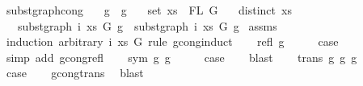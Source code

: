 \begin{isabellebody}
\isamarkupfalse%
%
\endisatagproof
{\isafoldproof}%
%
\isadelimproof
\isanewline
%
\endisadelimproof
\isanewline
\isanewline
\isanewline
{}\isamarkupfalse%
\ subst{\isacharunderscore}{\kern0pt}graph{\isacharunderscore}{\kern0pt}cong{\isacharcolon}{\kern0pt}\isanewline
\ \ \ {\isachardoublequoteopen}g{}\ {\isasymsimeq}\ g{}{\isachardoublequoteclose}\isanewline
\ \ \ {\isachardoublequoteopen}set\ xs\ {\isacharequal}{\kern0pt}\ FL\ G{\isachardoublequoteclose}\isanewline
\ \ \ {\isachardoublequoteopen}distinct\ xs{\isachardoublequoteclose}\isanewline
\ \ \ {\isachardoublequoteopen}subst{\isacharunderscore}{\kern0pt}graph\ i\ xs\ G\ g{}\ {\isasymsimeq}\ subst{\isacharunderscore}{\kern0pt}graph\ i\ xs\ G\ g{}{\isachardoublequoteclose}\isanewline
%
\isadelimproof
%
\endisadelimproof
%
\isatagproof
{}\isamarkupfalse%
\ assms\isanewline
{}\isamarkupfalse%
\ {\isacharparenleft}{\kern0pt}induction\ arbitrary{\isacharcolon}{\kern0pt}\ i\ xs\ G\ rule{\isacharcolon}{\kern0pt}\ gcong{\isachardot}{\kern0pt}induct{\isacharparenright}{\kern0pt}\isanewline
\ \ \isamarkupfalse%
\ {\isacharparenleft}{\kern0pt}refl\ g{\isacharparenright}{\kern0pt}\isanewline
\ \ \isamarkupfalse%
\ \isamarkupfalse%
\ {\isacharquery}{\kern0pt}case\isanewline
\ \ \isamarkupfalse%
\ {\isacharparenleft}{\kern0pt}simp\ add{\isacharcolon}{\kern0pt}\ gcong{\isachardot}{\kern0pt}refl{\isacharparenright}{\kern0pt}\isanewline
{}\isamarkupfalse%
\isanewline
\ \ \isamarkupfalse%
\ {\isacharparenleft}{\kern0pt}sym\ g{}\ g{}{\isacharparenright}{\kern0pt}\isanewline
\ \ \isamarkupfalse%
\ \isamarkupfalse%
\ {\isacharquery}{\kern0pt}case\isanewline
\ \ \isamarkupfalse%
\ blast\isanewline
{}\isamarkupfalse%
\isanewline
\ \ \isamarkupfalse%
\ {\isacharparenleft}{\kern0pt}trans\ g{}\ g{}\ g{}{\isacharparenright}{\kern0pt}\isanewline
\ \ \isamarkupfalse%
\ \isamarkupfalse%
\ {\isacharquery}{\kern0pt}case\isanewline
\ \ \isamarkupfalse%
\ gcong{\isachardot}{\kern0pt}trans\ \isamarkupfalse%
\ blast\isanewline
{}\isamarkupfalse%
\isanewline

\end{isabellebody}
